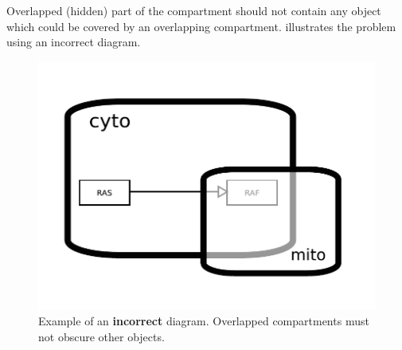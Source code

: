 Overlapped (hidden) part of the compartment should not contain any object which could be covered by an overlapping compartment.   illustrates the problem using an incorrect diagram.

\begin{figure}[H]
  \centering
  \includegraphics[scale = 0.45]{examples/compartment_overlapping_wrong}
  \caption{Example of an \textbf{incorrect} diagram.  Overlapped compartments must not obscure other objects.}
  \label{fig:overlap-bad}
\end{figure}


